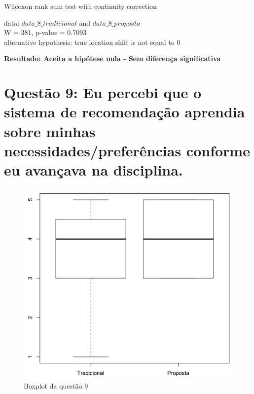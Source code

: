 Wilcoxon rank sum test with continuity correction

\noindent
data:  $data\_8\_tradicional$ and $data\_8\_proposta$\\
W = 381, p-value = 0.7093\\
alternative hypothesis: true location shift is not equal to 0

\noindent
\textbf{Resultado: Aceita a hipótese nula - Sem diferença significativa}

\newpage
\section{Questão 9: Eu percebi que o sistema de recomendação aprendia sobre minhas necessidades/preferências conforme eu avançava na disciplina.}

\begin{figure}[htb]
  \caption{\label{fig:questao9-boxplot}Boxplot da questão 9}
  \begin{center}
      \includegraphics[scale=0.4]{./Figuras/questao9-boxplot.png}
  \end{center}
\end{figure}

